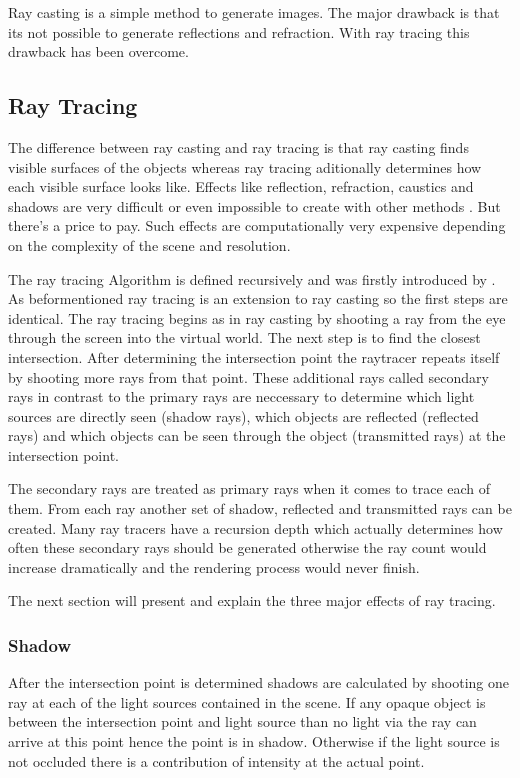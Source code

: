 \documentclass[DIV10, abstracton, openright, footsepline, headsepline, twoside, 9pt,
bigheadings]{scrreprt}
\begin{document}
Ray casting is a simple method to generate images. The major drawback is that
its not possible to generate reflections and refraction. With ray tracing this
drawback has been overcome.

\subsection{Ray Tracing}
The difference between ray casting and ray tracing is that ray casting finds
visible surfaces of the objects whereas ray tracing aditionally determines how
each visible surface looks like. Effects like reflection, refraction, caustics
and shadows are very difficult or even impossible to create with other methods
\cite{Foley90}. But there's a price to pay. Such effects are computationally
very expensive depending on the complexity of the scene and resolution.

The ray tracing Algorithm is defined recursively and was firstly introduced by
\cite{Whitted80}. As beformentioned ray tracing is an extension to ray casting
so the first steps are identical. The ray tracing begins as in ray casting by
shooting a ray from the eye through the screen into the virtual world. The next
step is to find the closest intersection. After determining the intersection
point the raytracer repeats itself by shooting more rays from that point. These
additional rays called secondary rays in contrast to the primary rays are neccessary
 to determine which light sources are directly seen (shadow rays), which objects
 are reflected (reflected rays) and which objects can be seen through the object
 (transmitted rays) at the intersection point.

The secondary rays are treated as primary rays when it comes to trace each of
them. From each ray another set of shadow, reflected and transmitted rays can
be created. Many ray tracers have a recursion depth which actually determines
how often these secondary rays should be generated otherwise the ray count
would increase dramatically and the rendering process would never finish.

The next section will present and explain the three major effects of ray
tracing.

\subsubsection{Shadow}
After the intersection point is determined shadows are calculated by shooting
one ray at each of the light sources contained in the scene. If any opaque
object is between the intersection point and light source than no light via the
ray can arrive at this point hence the point is in shadow. Otherwise if the
light source is not occluded there is a contribution of intensity at the actual
point.
\end{document}
